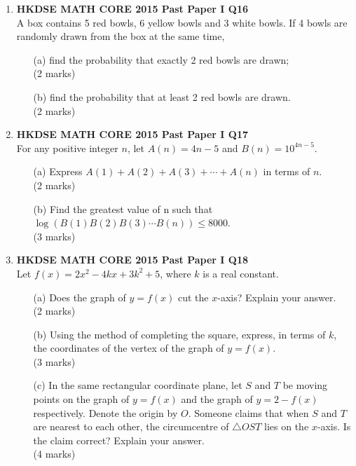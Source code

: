 \documentclass[12pt]{article}
\begin{document}
\begin{enumerate}
	\item \textbf{HKDSE MATH CORE 2015 Past Paper I Q16}\\
	A box contains 5 red bowls, 6 yellow bowls and 3 white bowls. If 4 bowls are randomly drawn from the box at the same time,
	\begin{enumerate}
		\item[(a)] find the probability that exactly 2 red bowls are drawn; \\(2 marks)
		\item[(b)] find the probability that at least 2 red bowls are drawn. \\(2 marks)
	\end{enumerate}

	\item \textbf{HKDSE MATH CORE 2015 Past Paper I Q17}\\
	For any positive integer $n$, let $A(n) = 4n - 5$ and $B(n) = 10^{4n-5}$.
	\begin{enumerate}
		\item[(a)] Express $A(1) + A(2) + A(3) + \cdots + A(n)$ in terms of $n$. \\(2 marks)
		\item[(b)] Find the greatest value of n such that $\log{(B(1)B(2)B(3)\cdots B(n))}\leq 8000$. \\(3 marks)
	\end{enumerate}

	\item \textbf{HKDSE MATH CORE 2015 Past Paper I Q18}\\
	Let $f(x) = 2x^2 -4kx + 3k^2 + 5$, where $k$ is a real constant.
	\begin{enumerate}
		\item[(a)] Does the graph of $y = f(x)$ cut the $x$-axis? Explain your answer. \\(2 marks)
		\item[(b)] Using the method of completing the square, express, in terms of $k$, the coordinates of the vertex of the graph of $y = f(x)$. \\(3 marks)
		\item[(c)] In the same rectangular coordinate plane, let $S$ and $T$ be moving points on the graph of $y = f(x)$ and the graph of $y = 2 - f(x)$ respectively. Denote the origin by $O$. Someone claims that when $S$ and $T$ are nearest to each other, the circumcentre of $\triangle OST$ lies on the $x$-axis. Is the claim correct? Explain your answer. \\(4 marks)
	\end{enumerate}


\end{enumerate}
\end{document}
